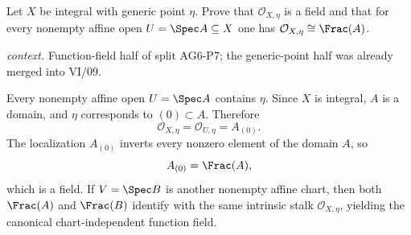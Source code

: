 \begin{problem}\label{prob:vi27-p03}
Let \(X\) be integral with generic point \(\eta\). Prove that \(\mathcal O_{X,\eta}\) is a field and that for every nonempty affine open \(U=\Spec A\subseteq X\) one has \(\mathcal O_{X,\eta}\cong\Frac(A)\).
\par\smallskip\noindent\textit{context.} Function-field half of split AG6-P7; the generic-point half was already merged into VI/09.
\end{problem}

\ifdefined\FullProblemDossiers
\begin{solution}
Every nonempty affine open \(U=\Spec A\) contains \(\eta\). Since \(X\) is integral, \(A\) is a domain, and
\(\eta\) corresponds to \((0)\subset A\). Therefore
\[
\mathcal O_{X,\eta}=\mathcal O_{U,\eta}=A_{(0)}.
\]
The localization \(A_{(0)}\) inverts every nonzero element of the domain \(A\), so
\[
A_{(0)}=\Frac(A),
\]
which is a field. If \(V=\Spec B\) is another nonempty affine chart, then both \(\Frac(A)\) and \(\Frac(B)\)
identify with the same intrinsic stalk \(\mathcal O_{X,\eta}\), yielding the canonical chart-independent
function field.
\end{solution}
\fi
